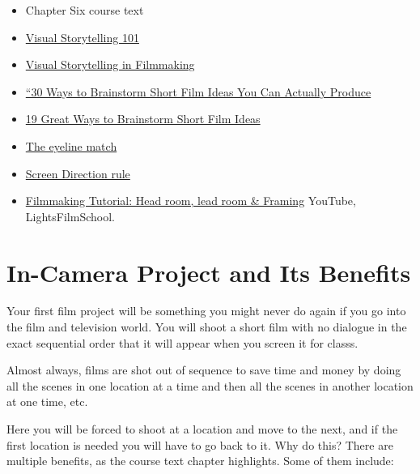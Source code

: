 \documentclass[
]{book}
\providecommand{\tightlist}{%
  \setlength{\itemsep}{0pt}\setlength{\parskip}{0pt}}
\begin{document}
\begin{itemize}
\tightlist
\item
  Chapter Six course text\\
\item
  \href{https://www.youtube.com/watch?v=iWQQgZh9EyE}{Visual Storytelling 101}\\
\item
  \href{https://www.youtube.com/watch?v=4X5xvlTZpcY}{Visual Storytelling in Filmmaking}\\
\item
  \href{https://www.studiobinder.com/blog/short-film-ideas-you-can-actually-produce/}{``30 Ways to Brainstorm Short Film Ideas You Can Actually Produce}\\
\item
  \href{https://www.indiewire.com/2015/08/19-great-ways-to-brainstorm-short-film-ideas-58785/}{19 Great Ways to Brainstorm Short Film Ideas}\\
\item
  \href{https://www.youtube.com/watch?v=y_1H6V7uyYc}{The eyeline match}\\
\item
  \href{https://www.youtube.com/watch?v=9XOn5uxdSJc}{Screen Direction rule}
\end{itemize}

\begin{itemize}
\tightlist
\item
  \href{https://www.youtube.com/watch?v=0pd0K2u1Bk8}{Filmmaking Tutorial: Head room, lead room \& Framing} YouTube, LightsFilmSchool.
\end{itemize}

\hypertarget{in-camera-project-and-its-benefits}{%
\section{In-Camera Project and Its Benefits}\label{in-camera-project-and-its-benefits}}

Your first film project will be something you might never do again if you go into the film and television world. You will shoot a short film with no dialogue in the exact sequential order that it will appear when you screen it for classs.

Almost always, films are shot out of sequence to save time and money by doing all the scenes in one location at a time and then all the scenes in another location at one time, etc.

Here you will be forced to shoot at a location and move to the next, and if the first location is needed you will have to go back to it. Why do this? There are multiple benefits, as the course text chapter highlights. Some of them include:
\end{document}
